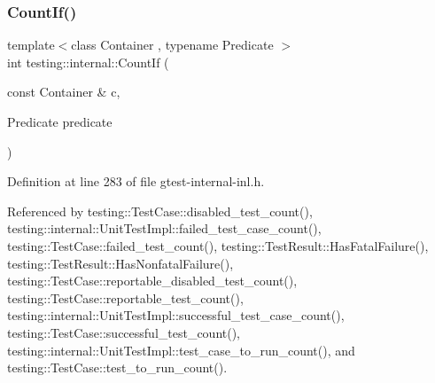 \subsubsection{\texorpdfstring{Count\+If()}{CountIf()}}
{\footnotesize\ttfamily template$<$class Container , typename Predicate $>$ \\
int testing\+::internal\+::\+Count\+If (\begin{DoxyParamCaption}\item[{const Container \&}]{c,  }\item[{Predicate}]{predicate }\end{DoxyParamCaption})\hspace{0.3cm}{\ttfamily [inline]}}



Definition at line 283 of file gtest-\/internal-\/inl.\+h.



Referenced by testing\+::\+Test\+Case\+::disabled\+\_\+test\+\_\+count(), testing\+::internal\+::\+Unit\+Test\+Impl\+::failed\+\_\+test\+\_\+case\+\_\+count(), testing\+::\+Test\+Case\+::failed\+\_\+test\+\_\+count(), testing\+::\+Test\+Result\+::\+Has\+Fatal\+Failure(), testing\+::\+Test\+Result\+::\+Has\+Nonfatal\+Failure(), testing\+::\+Test\+Case\+::reportable\+\_\+disabled\+\_\+test\+\_\+count(), testing\+::\+Test\+Case\+::reportable\+\_\+test\+\_\+count(), testing\+::internal\+::\+Unit\+Test\+Impl\+::successful\+\_\+test\+\_\+case\+\_\+count(), testing\+::\+Test\+Case\+::successful\+\_\+test\+\_\+count(), testing\+::internal\+::\+Unit\+Test\+Impl\+::test\+\_\+case\+\_\+to\+\_\+run\+\_\+count(), and testing\+::\+Test\+Case\+::test\+\_\+to\+\_\+run\+\_\+count().


